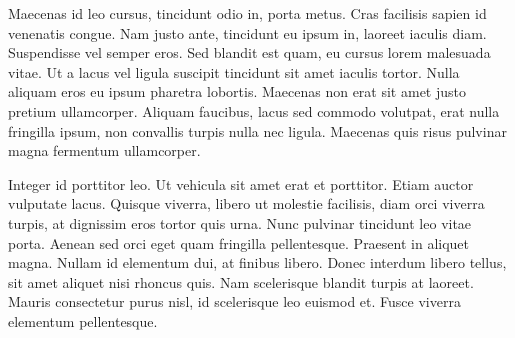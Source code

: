 Maecenas id leo cursus, tincidunt odio in, porta metus. Cras facilisis sapien id venenatis congue. Nam justo ante, tincidunt eu ipsum in, laoreet iaculis diam. Suspendisse vel semper eros. Sed blandit est quam, eu cursus lorem malesuada vitae. Ut a lacus vel ligula suscipit tincidunt sit amet iaculis tortor. Nulla aliquam eros eu ipsum pharetra lobortis. Maecenas non erat sit amet justo pretium ullamcorper. Aliquam faucibus, lacus sed commodo volutpat, erat nulla fringilla ipsum, non convallis turpis nulla nec ligula. Maecenas quis risus pulvinar magna fermentum ullamcorper.

Integer id porttitor leo. Ut vehicula sit amet erat et porttitor. Etiam auctor vulputate lacus. Quisque viverra, libero ut molestie facilisis, diam orci viverra turpis, at dignissim eros tortor quis urna. Nunc pulvinar tincidunt leo vitae porta. Aenean sed orci eget quam fringilla pellentesque. Praesent in aliquet magna. Nullam id elementum dui, at finibus libero. Donec interdum libero tellus, sit amet aliquet nisi rhoncus quis. Nam scelerisque blandit turpis at laoreet. Mauris consectetur purus nisl, id scelerisque leo euismod et. Fusce viverra elementum pellentesque. 

  
  